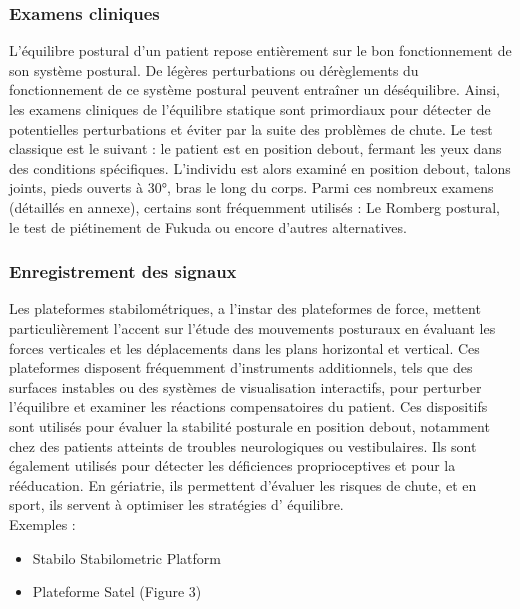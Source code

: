 \subsubsection{Examens cliniques}

L’équilibre postural d’un patient repose entièrement sur le bon fonctionnement de 
son système postural. De légères perturbations ou dérèglements du fonctionnement 
de ce système postural peuvent  entraîner un déséquilibre. Ainsi, les examens 
cliniques de l’équilibre statique sont primordiaux pour détecter de potentielles 
perturbations et éviter par la suite des problèmes de chute. Le test classique 
est le suivant :  le patient est en position debout, fermant les yeux dans des 
conditions spécifiques.  L’individu est alors examiné en position debout, talons 
joints, pieds ouverts à 30°, bras le long du corps. Parmi ces nombreux examens 
(détaillés en annexe), certains sont fréquemment utilisés : Le Romberg postural, 
le test de piétinement de Fukuda ou encore d’autres alternatives. 


\subsubsection{Enregistrement des signaux}
Les plateformes stabilométriques, a l’instar des plateformes de force, mettent 
particulièrement l’accent sur l'étude des mouvements posturaux en évaluant les 
forces verticales et les déplacements dans les plans horizontal et vertical. Ces 
plateformes disposent fréquemment d’instruments additionnels, tels que des surfaces 
instables ou des systèmes de visualisation interactifs, pour perturber l'équilibre 
et examiner les réactions compensatoires du patient. Ces dispositifs sont utilisés 
pour évaluer la stabilité posturale en position debout, notamment chez des patients 
atteints de troubles neurologiques ou vestibulaires. Ils sont également utilisés 
pour détecter les déficiences proprioceptives et pour la rééducation. En gériatrie, 
ils permettent d'évaluer les risques de chute, et en sport, ils servent à optimiser 
les stratégies d' équilibre.\\ 

Exemples : 
\begin{itemize}
    
    \item Stabilo Stabilometric Platform 
    \item Plateforme  Satel (Figure 3)
\end{itemize}

